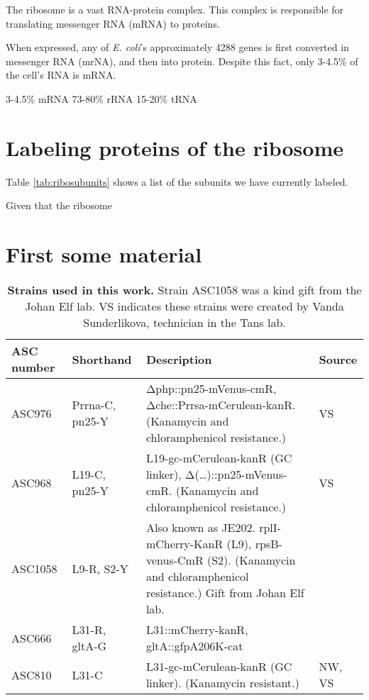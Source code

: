 The ribosome is a vast RNA-protein complex. 
This complex is responsible for translating messenger RNA (mRNA) to proteins.


When expressed, any of \textit{E. coli}'s approximately 4288 genes \cite{Blattner1997} is first converted in messenger RNA (mrNA), and then into protein.
Despite this fact, only 3-4.5\% of the cell's RNA is mRNA.


3-4.5\% mRNA
73-80\% rRNA
15-20\% tRNA

\cite{Norris1972}


\section{Labeling proteins of the ribosome}

Table \ref{tab:ribosubunits} shows a list of the subunits we have currently labeled.

Given that the ribosome



\section{First some material}

\begin{table}[h]
    \begin{tabularx}{\textwidth}{llXl}
        \textbf{ASC number}	& \textbf{Shorthand} & \textbf{Description} & \textbf{Source}		\\
        \hline
        ASC976  &	Prrna-C, pn25-Y	&	Δphp::pn25-mVenus-cmR, Δche::Prrsa-mCerulean-kanR. (Kanamycin and chloramphenicol resistance.)  & VS \\
        ASC968	& L19-C, pn25-Y	& L19-gc-mCerulean-kanR (GC linker), Δ(…)::pn25-mVenus-cmR.	(Kanamycin and chloramphenicol resistance.)	& VS \\
        ASC1058	& L9-R, S2-Y	& Also known as JE202. rplI-mCherry-KanR (L9), rpsB-venus-CmR (S2). (Kanamycin and chloramphenicol resistance.) Gift from Johan Elf lab. & \cite{Wallden2016} \\
        \hline
        ASC666 & L31-R, gltA-G  & L31::mCherry-kanR, gltA::gfpA206K-cat & \cite{Kiviet2014} \\
        ASC810	& L31-C & L31-gc-mCerulean-kanR (GC linker). (Kanamycin resistant.) & NW, VS \\
        \hline
\end{tabularx}
\caption{\textbf{Strains used in this work.} Strain ASC1058 was a kind gift from the Johan Elf lab. VS indicates these strains were created by Vanda Sunderlikova, technician in the Tans lab.}
\label{table:ribostrains1}
\end{table}

